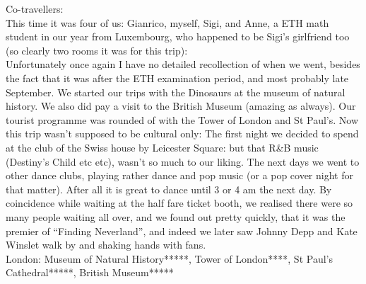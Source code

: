 Co-travellers:\\
This time it was four of us: Gianrico, myself, Sigi, and Anne, a ETH math student in our year from Luxembourg, who happened to be Sigi's girlfriend too (so clearly two rooms it was for this trip):\\

Unfortunately once again I have no detailed recollection of when we went, besides the fact that it was after the ETH examination period, and most probably late September. We started our trips with the Dinosaurs at the museum of natural history. We also did pay a visit to the British Museum (amazing as always). Our tourist programme was rounded of with the Tower of London and St Paul's. Now this trip wasn't supposed to be cultural only: The first night we decided to spend at the club of the Swiss house by Leicester Square: but that R\&B music (Destiny's Child etc etc), wasn't so much to our liking. The next days we went to other dance clubs, playing rather dance and pop music (or a pop cover night for that matter). After all it is great to dance until 3 or 4 am the next day. By coincidence while waiting at the half fare ticket booth, we realised there were so many people waiting all over, and we found out pretty quickly, that it was the premier of ``Finding Neverland'', and indeed we later saw Johnny Depp and Kate Winslet walk by and shaking hands with fans.\\

London: Museum of Natural History*****, Tower of London****, St Paul's Cathedral*****, British Museum*****
